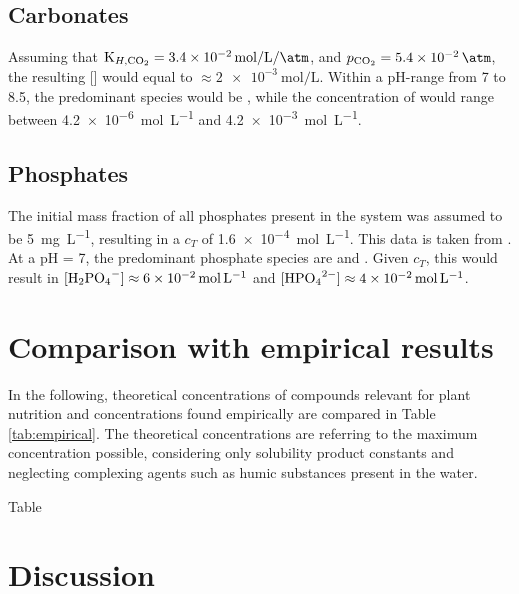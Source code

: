\documentclass{scrartcl}
\begin{document}
\subsection{Carbonates}
Assuming that $\text{K}_{H, \ce{CO2}} = \SI{3.4e-2}{\mol\per\liter\per\atm}$, and $p_{\ce{CO2}} = \SI{5.4e-2}{\atm}$, the resulting [] would equal to $\approx \SI{2e-3}{\mol\per\liter}$. Within a pH-range from 7 to 8.5, the predominant species would be , while the concentration of  would range between \SI{4.2e-6}{\mol\per\liter} and \SI{4.2e-3}{\mol\per\liter}.
% 
%
%
\subsection{Phosphates}
The initial mass fraction of all phosphates present in the system was assumed to be \SI{5}{\milli\gram\per\liter}, resulting in a $c_{T}$  of \SI{1.6e-4}{\mol\per\liter}. This data is taken from \cite{Shaw2022}.\\
At a pH = 7, the predominant phosphate species are  and . Given $c_{T}$, this would result in $[\ce{H2PO4-}] \approx \SI{6e-2}{\mol\per\liter}$ and $[\ce{HPO4^2-}] \approx \SI{4e-2}{\mol\per\liter}$.
%
%
%
\section{Comparison with empirical results}
In the following, theoretical concentrations of compounds relevant for plant nutrition and concentrations found empirically are compared in Table \ref{tab:empirical}. The theoretical concentrations are referring to the maximum concentration possible, considering only solubility product constants and neglecting complexing agents such as humic substances present in the water.
%
%
%
%
%	
\begin{table}[!h]
	\caption{Table}
	\label{tab:empirical}
\vspace{5mm}
%
\end{table}
%
%
%
\section{Discussion}
\end{document}
